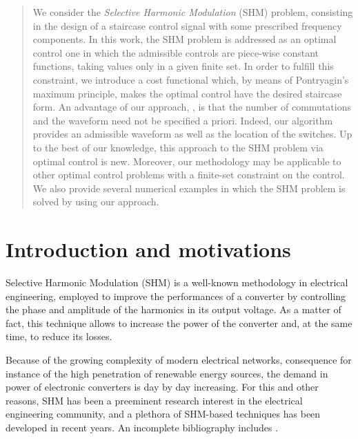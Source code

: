 \documentclass[twocolumn]{autart}    %
\begin{document}
\begin{frontmatter}
\begin{abstract}                          %
We consider the \emph{Selective Harmonic Modulation} (SHM) problem, consisting in the design of a staircase control signal with some prescribed frequency components. In this work, the SHM problem is addressed as an optimal control one in which the admissible controls are piece-wise constant functions, taking values only in a given finite set. In order to fulfill this constraint, we  introduce a cost functional  which, by means of Pontryagin's maximum principle, makes the optimal control have the desired staircase form. An advantage of our approach, , is that the number of commutations and the waveform need not be specified a priori. Indeed, our algorithm provides an admissible waveform as well as the location of the switches. Up to the best of our knowledge, this approach to the SHM problem via optimal control is new. Moreover, our methodology may be applicable to other optimal control problems with a finite-set constraint on the control. We also provide several numerical examples in which the SHM problem is solved by using our approach.
\end{abstract}

\end{frontmatter}


\section{Introduction and motivations}\label{Section1}

Selective Harmonic Modulation (SHM) \cite{Rodriguez2002} is a well-known methodology in electrical engineering, employed to improve the performances of a converter by controlling the phase and amplitude of the harmonics in its output voltage. As a matter of fact, this technique allows to increase the power of the converter and, at the same time, to reduce its losses. 

Because of the growing complexity of modern electrical networks, consequence for instance of the high penetration of renewable energy sources, the demand in power of electronic converters is day by day increasing. For this and other reasons, SHM has been a preeminent research interest in the electrical engineering community, and a plethora of SHM-based techniques has been developed in recent years. An incomplete bibliography includes \cite{duranay2017selective,Janabi2020,Yang2017}.
\end{document}
